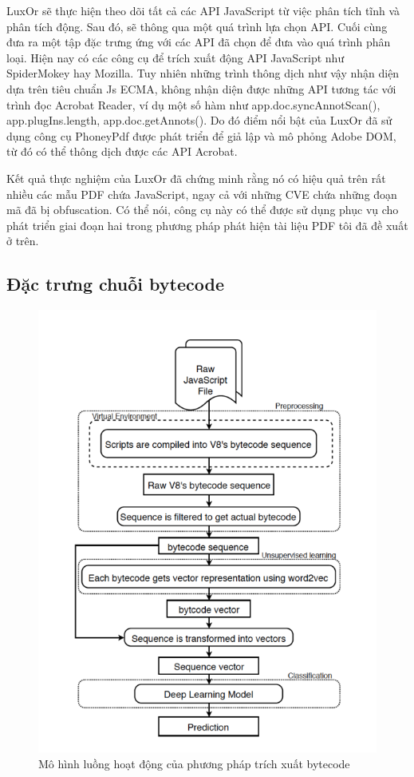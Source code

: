 \documentclass[./../main.tex]{subfiles}
\begin{document}
LuxOr sẽ thực hiện theo dõi tất cả các API JavaScript từ việc phân tích tĩnh và phân tích động. Sau đó, sẽ thông qua một quá trình lựa chọn API. Cuối cùng đưa ra một tập đặc trưng ứng với các API đã chọn để đưa vào quá trình phân loại. Hiện nay có các công cụ để trích xuất động API JavaScript như SpiderMokey hay Mozilla. Tuy nhiên những trình thông dịch như vậy nhận diện dựa trên tiêu chuẩn Js ECMA, không nhận diện được những API tương tác với trình đọc Acrobat Reader, ví dụ một số hàm như app.doc.syncAnnotScan(), app.plugIns.length, app.doc.getAnnots(). Do đó điểm nổi bật của LuxOr đã sử dụng công cụ PhoneyPdf được phát triển để giả lập và mô phỏng Adobe DOM, từ đó có thể thông dịch được các API Acrobat.

Kết quả thực nghiệm của LuxOr đã chứng minh rằng nó có hiệu quả trên rất nhiều các mẫu PDF chứa JavaScript, ngay cả với những CVE chứa những đoạn mã đã bị obfuscation. Có thể nói, công cụ này có thể được sử dụng phục vụ cho phát triển giai đoạn hai trong phương pháp phát hiện tài liệu PDF tôi đã đề xuất ở trên.

\subsection{Đặc trưng chuỗi bytecode}

\begin{figure}[H]
	\centering
	\includegraphics[width=0.7\linewidth]{./images/bytecode_flow.png}
	\caption{Mô hình luồng hoạt động của phương pháp trích xuất bytecode \cite{bytecode}}
	\label{fig:bytecode_flow}
\end{figure}
\end{document}
